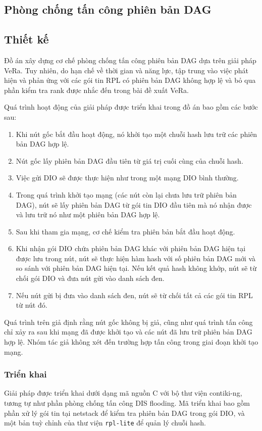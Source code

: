 \subsection{Phòng chống tấn công phiên bản DAG}
\label{prevention:dag-version-attacks}
\subsection{Thiết kế}
Đồ án xây dựng cơ chế phòng chống tấn công phiên bản DAG dựa trên giải pháp VeRa. Tuy nhiên, do hạn chế về thời gian và năng lực, tập trung vào việc phát hiện và phản ứng với các gói tin RPL có phiên bản DAG không hợp lệ và bỏ qua phần kiểm tra rank được nhắc đến trong bài đề xuất VeRa.

Quá trình hoạt động của giải pháp được triển khai trong đồ án bao gồm các bước sau:

\begin{enumerate}
    \item Khi nút gốc bắt đầu hoạt động, nó khởi tạo một chuỗi hash lưu trữ các phiên bản DAG hợp lệ.
    \item Nút gốc lấy phiên bản DAG đầu tiên từ giá trị cuối cùng của chuỗi hash.
    \item Việc gửi DIO sẽ được thực hiện như trong một mạng DIO bình thường.
    \item Trong quá trình khởi tạo mạng (các nút còn lại chưa lưu trữ phiên bản DAG), nút sẽ lấy phiên bản DAG từ gói tin DIO đầu tiên mà nó nhận được và lưu trữ nó như một phiên bản DAG hợp lệ.
    \item Sau khi tham gia mạng, cơ chế kiểm tra phiên bản bắt đầu hoạt động.
    \item Khi nhận gói DIO chứa phiên bản DAG khác với phiên bản DAG hiện tại được lưu trong nút, nút sẽ thực hiện hàm hash với số phiên bản DAG mới và so sánh với phiên bản DAG hiện tại. Nếu kết quả hash không khớp, nút sẽ từ chối gói DIO và đưa nút gửi vào danh sách đen.
    \item Nếu nút gửi bị đưa vào danh sách đen, nút sẽ từ chối tất cả các gói tin RPL từ nút đó.
\end{enumerate}

Quá trình trên giả định rằng nút gốc không bị giả, cũng như quá trình tấn công chỉ xảy ra sau khi mạng đã được khởi tạo và các nút đã lưu trữ phiên bản DAG hợp lệ. Nhóm tác giả không xét đến trường hợp tấn công trong giai đoạn khởi tạo mạng.

\subsubsection{Triển khai}
Giải pháp được triển khai dưới dạng mã nguồn C với bộ thư viện contiki-ng, tương tự như phần phòng chống tấn công DIS flooding. Mã triển khai bao gồm phần xử lý gói tin tại netstack để kiểm tra phiên bản DAG trong gói DIO, và một bản tuỳ chỉnh của thư viện \texttt{rpl-lite} để quản lý chuỗi hash.

